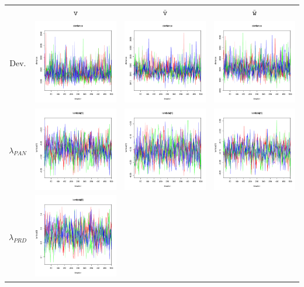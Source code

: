 \documentclass[letter,12pt]{article}
\begin{document}
\begin{table}
\centering
\begin{tabular}{cccc}
                     & $\texttt{v}$ & $\bar{\texttt{v}}$ & $\bar{\texttt{w}}$ \\ 
    Dev.             & \includegraphics[width=.15\columnwidth]{../graphs/traceplots/2015d3v_1.pdf} &
                        \includegraphics[width=.15\columnwidth]{../graphs/traceplots/2015d3vbar_1.pdf} &
                         \includegraphics[width=.15\columnwidth]{../graphs/traceplots/2015d3wbar_1.pdf} \\
    $\lambda_{PAN}$   & \includegraphics[width=.15\columnwidth]{../graphs/traceplots/2015d3v_2.pdf} &
                        \includegraphics[width=.15\columnwidth]{../graphs/traceplots/2015d3vbar_2.pdf} &
                         \includegraphics[width=.15\columnwidth]{../graphs/traceplots/2015d3wbar_2.pdf} \\
    $\lambda_{PRD}$   & \includegraphics[width=.15\columnwidth]{../graphs/traceplots/2015d3v_3.pdf} &

\end{tabular}
\end{table}
\end{document}
